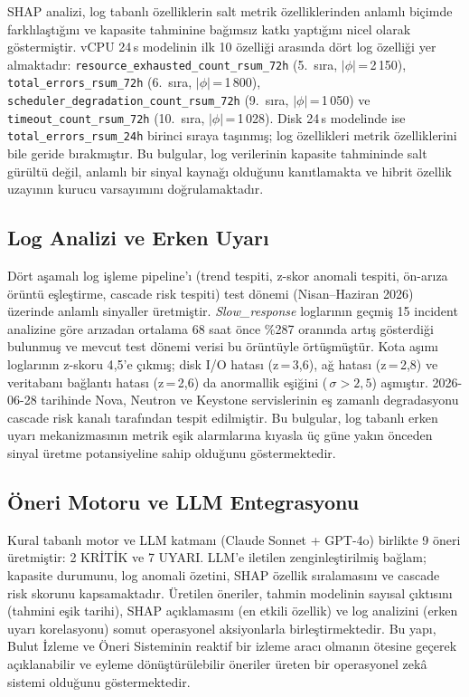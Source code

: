 SHAP analizi, log tabanlı özelliklerin salt metrik özelliklerinden anlamlı biçimde farklılaştığını ve kapasite tahminine bağımsız katkı yaptığını nicel olarak göstermiştir.
vCPU 24\,s modelinin ilk 10 özelliği arasında dört log özelliği yer almaktadır:
\texttt{resource\_exhausted\_count\_rsum\_72h} (5.\ sıra, $|\phi|$\,=\,2\,150),
\texttt{total\_errors\_rsum\_72h} (6.\ sıra, $|\phi|$\,=\,1\,800),
\texttt{scheduler\_degradation\_count\_rsum\_72h} (9.\ sıra, $|\phi|$\,=\,1\,050) ve
\texttt{timeout\_count\_rsum\_72h} (10.\ sıra, $|\phi|$\,=\,1\,028).
Disk 24\,s modelinde ise \texttt{total\_errors\_rsum\_24h} birinci sıraya taşınmış; log özellikleri metrik özelliklerini bile geride bırakmıştır.
Bu bulgular, log verilerinin kapasite tahmininde salt gürültü değil, anlamlı bir sinyal kaynağı olduğunu kanıtlamakta ve hibrit özellik uzayının kurucu varsayımını doğrulamaktadır.

\subsection{Log Analizi ve Erken Uyarı}

Dört aşamalı log işleme pipeline'ı (trend tespiti, z-skor anomali tespiti, ön-arıza örüntü eşleştirme, cascade risk tespiti) test dönemi (Nisan--Haziran 2026) üzerinde anlamlı sinyaller üretmiştir.
\textit{Slow\_response} loglarının geçmiş 15 incident analizine göre arızadan ortalama 68 saat önce \%287 oranında artış gösterdiği bulunmuş ve mevcut test dönemi verisi bu örüntüyle örtüşmüştür.
Kota aşımı loglarının z-skoru 4{,}5'e çıkmış; disk I/O hatası (z\,=\,3{,}6), ağ hatası (z\,=\,2{,}8) ve veritabanı bağlantı hatası (z\,=\,2{,}6) da anormallik eşiğini (\,$\sigma > 2{,}5$) aşmıştır.
2026-06-28 tarihinde Nova, Neutron ve Keystone servislerinin eş zamanlı degradasyonu cascade risk kanalı tarafından tespit edilmiştir.
Bu bulgular, log tabanlı erken uyarı mekanizmasının metrik eşik alarmlarına kıyasla üç güne yakın önceden sinyal üretme potansiyeline sahip olduğunu göstermektedir.

\subsection{Öneri Motoru ve LLM Entegrasyonu}

Kural tabanlı motor ve LLM katmanı (Claude Sonnet + GPT-4o) birlikte 9 öneri üretmiştir: 2 KRİTİK ve 7 UYARI.
LLM'e iletilen zenginleştirilmiş bağlam; kapasite durumunu, log anomali özetini, SHAP özellik sıralamasını ve cascade risk skorunu kapsamaktadır.
Üretilen öneriler, tahmin modelinin sayısal çıktısını (tahmini eşik tarihi), SHAP açıklamasını (en etkili özellik) ve log analizini (erken uyarı korelasyonu) somut operasyonel aksiyonlarla birleştirmektedir.
Bu yapı, Bulut İzleme ve Öneri Sisteminin reaktif bir izleme aracı olmanın ötesine geçerek açıklanabilir ve eyleme dönüştürülebilir öneriler üreten bir operasyonel zekâ sistemi olduğunu göstermektedir.


